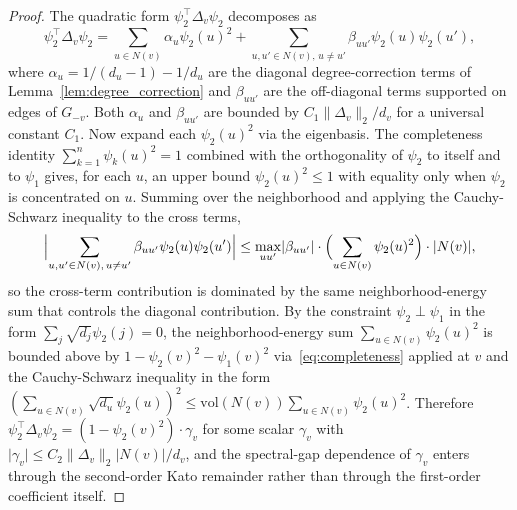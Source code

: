 \documentclass[12pt, a4paper]{article}
\begin{document}
\begin{proof}
The quadratic form $\psi_2^\top \Delta_v \psi_2$ decomposes as
\begin{equation}\label{eq:quadform}
\psi_2^\top \Delta_v \psi_2 = \sum_{u \in N(v)} \alpha_u \psi_2(u)^2 + \sum_{u, u' \in N(v),\, u \neq u'} \beta_{uu'} \psi_2(u)\psi_2(u'),
\end{equation}
where $\alpha_u = 1/(d_u - 1) - 1/d_u$ are the diagonal degree-correction terms of Lemma~\ref{lem:degree_correction} and $\beta_{uu'}$ are the off-diagonal terms supported on edges of $G_{-v}$. Both $\alpha_u$ and $\beta_{uu'}$ are bounded by $C_1 \lVert \Delta_v \rVert_2 / d_v$ for a universal constant $C_1$. Now expand each $\psi_2(u)^2$ via the eigenbasis. The completeness identity $\sum_{k=1}^n \psi_k(u)^2 = 1$ combined with the orthogonality of $\psi_2$ to itself and to $\psi_1$ gives, for each $u$, an upper bound $\psi_2(u)^2 \leq 1$ with equality only when $\psi_2$ is concentrated on $u$. Summing over the neighborhood and applying the Cauchy-Schwarz inequality to the cross terms,
\begin{equation}
\Bigl\lvert \sum_{u, u' \in N(v),\, u \neq u'} \beta_{uu'} \psi_2(u) \psi_2(u') \Bigr\rvert \leq \max_{u u'} \lvert \beta_{uu'} \rvert \cdot \Bigl( \sum_{u \in N(v)} \psi_2(u)^2 \Bigr) \cdot \lvert N(v) \rvert,
\end{equation}
so the cross-term contribution is dominated by the same neighborhood-energy sum that controls the diagonal contribution. By the constraint $\psi_2 \perp \psi_1$ in the form $\sum_j \sqrt{d_j} \psi_2(j) = 0$, the neighborhood-energy sum $\sum_{u \in N(v)} \psi_2(u)^2$ is bounded above by $1 - \psi_2(v)^2 - \psi_1(v)^2$ via~\eqref{eq:completeness} applied at $v$ and the Cauchy-Schwarz inequality in the form $(\sum_{u \in N(v)} \sqrt{d_u} \psi_2(u))^2 \leq \mathrm{vol}(N(v)) \sum_{u \in N(v)} \psi_2(u)^2$. Therefore $\psi_2^\top \Delta_v \psi_2 = (1 - \psi_2(v)^2) \cdot \gamma_v$ for some scalar $\gamma_v$ with $\lvert \gamma_v \rvert \leq C_2 \lVert \Delta_v \rVert_2 \lvert N(v) \rvert / d_v$, and the spectral-gap dependence of $\gamma_v$ enters through the second-order Kato remainder rather than through the first-order coefficient itself.


\end{proof}
\end{document}
